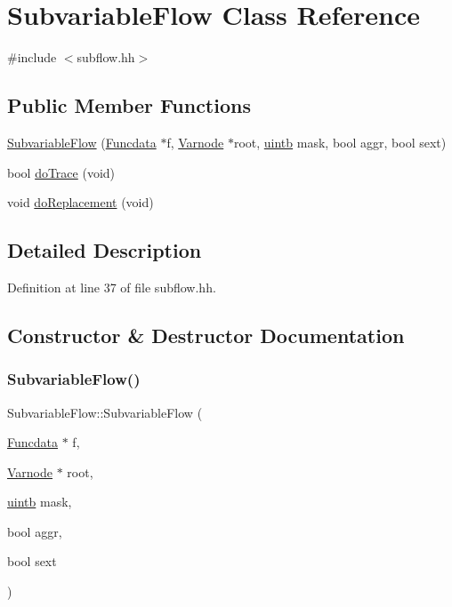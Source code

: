 \hypertarget{class_subvariable_flow}{}\section{Subvariable\+Flow Class Reference}
\label{class_subvariable_flow}


{\ttfamily \#include $<$subflow.\+hh$>$}

\subsection*{Public Member Functions}
\begin{DoxyCompactItemize}
\item 
\mbox{\hyperlink{class_subvariable_flow_aa87462fad4038e164a4840e3ed508ce0}{Subvariable\+Flow}} (\mbox{\hyperlink{class_funcdata}{Funcdata}} $\ast$f, \mbox{\hyperlink{class_varnode}{Varnode}} $\ast$root, \mbox{\hyperlink{types_8h_a2db313c5d32a12b01d26ac9b3bca178f}{uintb}} mask, bool aggr, bool sext)
\item 
bool \mbox{\hyperlink{class_subvariable_flow_ad6b6ba93a3249ba31526a01198111496}{do\+Trace}} (void)
\item 
void \mbox{\hyperlink{class_subvariable_flow_a75dd5e28aa46641f1561b1c51f0876c1}{do\+Replacement}} (void)
\end{DoxyCompactItemize}


\subsection{Detailed Description}


Definition at line 37 of file subflow.\+hh.



\subsection{Constructor \& Destructor Documentation}
\mbox{\label{class_subvariable_flow_aa87462fad4038e164a4840e3ed508ce0}} 
\subsubsection{\texorpdfstring{SubvariableFlow()}{SubvariableFlow()}}
{\footnotesize\ttfamily Subvariable\+Flow\+::\+Subvariable\+Flow (\begin{DoxyParamCaption}\item[{\mbox{\hyperlink{class_funcdata}{Funcdata}} $\ast$}]{f,  }\item[{\mbox{\hyperlink{class_varnode}{Varnode}} $\ast$}]{root,  }\item[{\mbox{\hyperlink{types_8h_a2db313c5d32a12b01d26ac9b3bca178f}{uintb}}}]{mask,  }\item[{bool}]{aggr,  }\item[{bool}]{sext }\end{DoxyParamCaption})}



